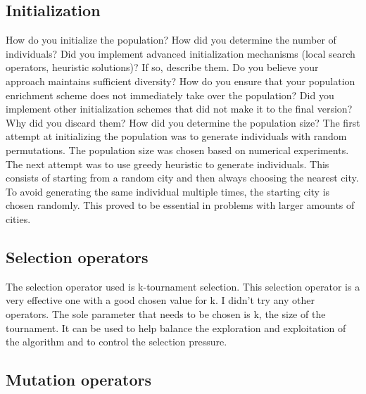 \documentclass[a4paper,10pt]{article}
\newcommand{\ReplaceMe}[1]{{\color{blue}#1}}
\begin{document}
\subsection{Initialization}

\ReplaceMe{How do you initialize the population? How did you determine the number of individuals? Did you implement advanced initialization mechanisms (local search operators, heuristic solutions)? If so, describe them. Do you believe your approach maintains sufficient diversity? How do you ensure that your population enrichment scheme does not immediately take over the population? Did you implement other initialization schemes that did not make it to the final version? Why did you discard them? How did you determine the population size?}
The first attempt at initializing the population was to generate individuals with random permutations. The population size was chosen based on numerical experiments. \\
The next attempt was to use greedy heuristic to generate individuals. This consists of starting from a random city and then always choosing the nearest city. To avoid generating the same individual multiple times, the starting city is chosen randomly. This proved to be essential in problems with larger amounts of cities. 


\subsection{Selection operators}

\begin{comment}
Which selection operators did you implement? If they are not from the slides, describe them. Can you motivate why you chose this one? Are there parameters that need to be chosen? Did you use an advanced scheme to vary these parameters throughout the iterations? Did you try other selection operators not included in the final version? Why did you discard them?    
\end{comment}

The selection operator used is k-tournament selection. This selection operator is a very effective one with a good chosen value for k. I didn't try any other operators. The sole parameter that needs to be chosen is k, the size of the tournament. It can be used to help balance the exploration and exploitation of the algorithm and to control the selection pressure.


\subsection{Mutation operators}
\end{document}
